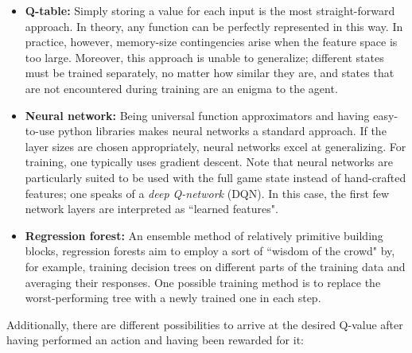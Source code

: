 \documentclass{article}
\begin{document}
\begin{itemize}
    \item \textbf{Q-table:} Simply storing a value for each input is the most straight-forward approach. In theory, any function can be perfectly represented in this way. In practice, however, memory-size contingencies arise when the feature space is too large. Moreover, this approach is unable to generalize; different states must be trained separately, no matter how similar they are, and states that are not encountered during training are an enigma to the agent.
    
    \item \textbf{Neural network:} Being universal function approximators and having easy-to-use python libraries makes neural networks a standard approach. If the layer sizes are chosen appropriately, neural networks excel at generalizing. For training, one typically uses gradient descent. Note that neural networks are particularly suited to be used with the full game state instead of hand-crafted features; one speaks of a \textit{deep Q-network} (DQN). In this case, the first few network layers are interpreted as ``learned features".

    \item \textbf{Regression forest:} An ensemble method of relatively primitive building blocks, regression forests aim to employ a sort of ``wisdom of the crowd" by, for example, training decision trees on different parts of the training data and averaging their responses. One possible training method is to replace the worst-performing tree with a newly trained one in each step.
\end{itemize}

Additionally, there are different possibilities to arrive at the desired Q-value after having performed an action and having been rewarded for it:
\end{document}
